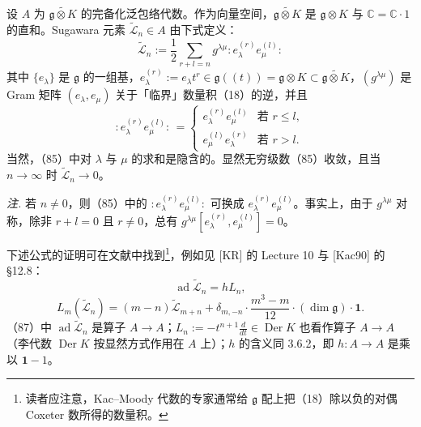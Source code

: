 设 $A$ 为 $\widetilde{\mathfrak{g}\otimes K}$ 的完备化泛包络代数。作为向量空间，$\widetilde{\mathfrak{g}\otimes K}$ 是 $\mathfrak{g}\otimes K$ 与 $\mathbb{C} = \mathbb{C}\cdot 1$ 的直和。Sugawara 元素 $\widetilde{\mathcal{L}}_{n} \in A$ 由下式定义：
\begin{equation}\tag{85}
\widetilde{\mathcal{L}}_{n} := \frac{1}{2}\sum_{r+l=n} g^{\lambda\mu} :e_{\lambda}^{(r)}e_{\mu}^{(l)}:
\end{equation}
其中 $\{e_{\lambda}\}$ 是 $\mathfrak{g}$ 的一组基，$e_{\lambda}^{(r)} := e_{\lambda}t^{r} \in \mathfrak{g}((t)) = \mathfrak{g}\otimes K \subset \widetilde{\mathfrak{g}\otimes K}$，$(g^{\lambda\mu})$ 是 Gram 矩阵 $(e_{\lambda}, e_{\mu})$ 关于「临界」数量积（18）的逆，并且
\begin{equation}\tag{86}
:e_{\lambda}^{(r)}e_{\mu}^{(l)}: \,=
\begin{cases}
e_{\lambda}^{(r)}e_{\mu}^{(l)} & \text{若 } r \le l,\\
e_{\mu}^{(l)}e_{\lambda}^{(r)} & \text{若 } r > l.
\end{cases}
\end{equation}
当然，（85）中对 $\lambda$ 与 $\mu$ 的求和是隐含的。显然无穷级数（85）收敛，且当 $n \to \infty$ 时 $\widetilde{\mathcal{L}}_{n} \to 0$。

\emph{注.} 若 $n \ne 0$，则（85）中的 $:e_{\lambda}^{(r)}e_{\mu}^{(l)}:$ 可换成 $e_{\lambda}^{(r)}e_{\mu}^{(l)}$。事实上，由于 $g^{\lambda\mu}$ 对称，除非 $r + l = 0$ 且 $r \ne 0$，总有 $g^{\lambda\mu}[e_{\lambda}^{(r)}, e_{\mu}^{(l)}] = 0$。


下述公式的证明可在文献中找到\footnote{读者应注意，Kac--Moody 代数的专家通常给 $\mathfrak{g}$ 配上把（18）除以负的对偶 Coxeter 数所得的数量积。}，例如见 [KR] 的 Lecture 10 与 [Kac90] 的 §12.8：
\begin{equation}\tag{87}
\operatorname{ad}\widetilde{\mathcal{L}}_{n} = hL_{n},
\end{equation}
\begin{equation}\tag{88}
L_{m}(\widetilde{\mathcal{L}}_{n}) = (m-n)\widetilde{\mathcal{L}}_{m+n} + \delta_{m,-n}\cdot\frac{m^{3}-m}{12}\cdot(\dim\mathfrak{g})\cdot\mathbf{1}.
\end{equation}
（87）中 $\operatorname{ad}\widetilde{\mathcal{L}}_{n}$ 是算子 $A \to A$；$L_{n} := -t^{n+1}\frac{d}{dt} \in \operatorname{Der} K$ 也看作算子 $A \to A$（李代数 $\operatorname{Der} K$ 按显然方式作用在 $A$ 上）；$h$ 的含义同 3.6.2，即 $h: A \to A$ 是乘以 $\mathbf{1} - 1$。

